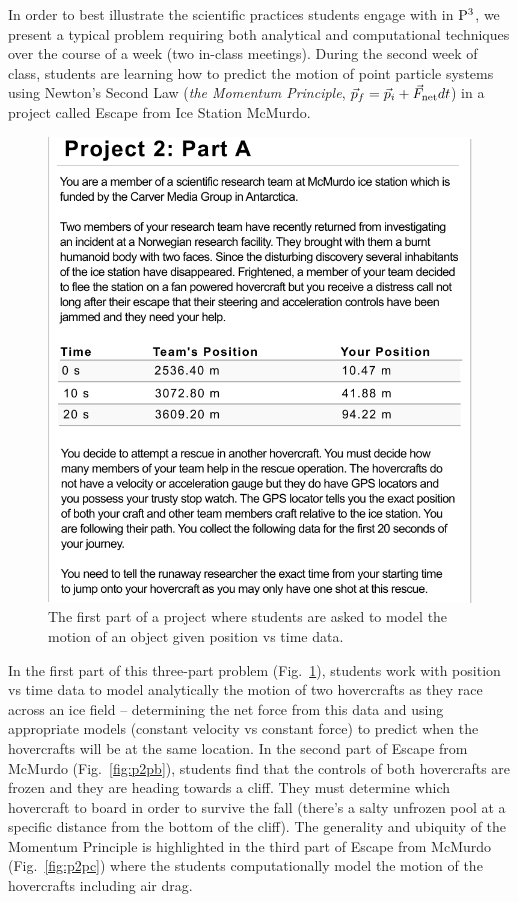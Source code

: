 \documentclass{msuphddissertation}
\begin{document}
\begin{doublespace}
In order to best illustrate the scientific practices students engage with in ${\rm P}^{3}$, we present a typical problem requiring both analytical and computational techniques over the course of a week (two in-class meetings).  During the second week of class, students are learning how to predict the motion of point particle systems using Newton's Second Law (\textit{the Momentum Principle}, $\vec{p}_f = \vec{p}_i + \vec{F}_{\rm net}dt$) in a project called Escape from Ice Station McMurdo.

\begin{figure}
\centering
\includegraphics[scale=1]{./images/parta.pdf}
\caption{The first part of a project where students are asked to model the motion of an object given position vs time data.}\label{fig:p2pa}
\end{figure}

In the first part of this three-part problem (Fig.~\ref{fig:p2pa}), students work with position vs time data to model analytically the motion of two hovercrafts as they race across an ice field -- determining the net force from this data and using appropriate models (constant velocity vs constant force) to predict when the hovercrafts will be at the same location.  In the second part of Escape from McMurdo (Fig.~\ref{fig:p2pb}), students find that the controls of both hovercrafts are frozen and they are heading towards a cliff.  They must determine which hovercraft to board in order to survive the fall (there's a salty unfrozen pool at a specific distance from the bottom of the cliff).  The generality and ubiquity of the Momentum Principle is highlighted in the third part of Escape from McMurdo (Fig.~\ref{fig:p2pc}) where the students computationally model the motion of the hovercrafts including air drag. 


\end{doublespace}
\end{document}
